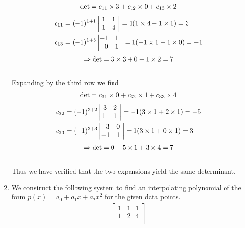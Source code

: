 \documentclass[12pt]{amsart}
\begin{document}
\begin{enumerate}
\begin{align}
			\det=c_{11}\times3+c_{12}\times0+c_{13}\times2 \notag
		\end{align}
		\begin{align}
			c_{11}&=(-1)^{1+1}
			\begin{vmatrix}
				\text{ }1 &1 \text{ } \\
				\text{ }1 &4 \text{ }
			\end{vmatrix} = 1(1\times4-1\times1)=3 \notag \\
			c_{13}&=(-1)^{1+3}
			\begin{vmatrix}
				-1 &1 \text{ } \\
				\text{ } \text{ }0 &1 \text{ }
			\end{vmatrix} = 1(-1\times1-1\times0)=-1 \notag
		\end{align}
		\begin{align}
			\Rightarrow \det=3\times3+0-1\times2=7 \notag
		\end{align} \\
		Expanding by the third row we find
		\begin{align}
			\det=c_{31}\times0+c_{32}\times1+c_{33}\times4 \notag
		\end{align}
		\begin{align}
			c_{32}&=(-1)^{3+2}
			\begin{vmatrix}
				\text{ } \text3 &2 \text{ } \\
				\-1 &1 \text{ }
			\end{vmatrix} = -1(3\times1+2\times1)=-5 \notag \\
			c_{33}&=(-1)^{3+3}
			\begin{vmatrix}
				\text{ } \text{ }3 &0 \text{ } \\
				-1 &1 \text{ }
			\end{vmatrix} = 1(3\times1+0\times1)=3\notag
		\end{align}
		\begin{align}
			\Rightarrow \det=0-5\times1+3\times4=7 \notag
		\end{align} \\
		Thus we have verified that the two expansions yield the same determinant.
		\\
		\item We construct the following system to find an interpolating polynomial of the form $p(x)=a_0
		+a_1x+a_2x^2$ for the given data points.
		\begin{align}
			\begin{bmatrix}
				1 &1 &1 \\
				1 &2 &4 \\

\end{bmatrix}
\end{align}
\end{enumerate}
\end{document}
